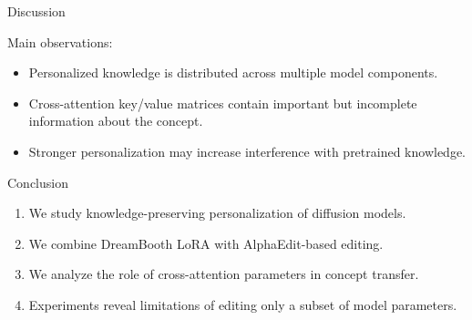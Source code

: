 \documentclass[aspectratio=169]{beamer}
\begin{document}


\begin{frame}{Discussion}


Main observations:


\begin{itemize}

\item Personalized knowledge is distributed across multiple model components.

\item Cross-attention key/value matrices contain important but incomplete
information about the concept.

\item Stronger personalization may increase interference with pretrained
knowledge.

\end{itemize}


\end{frame}




\begin{frame}{Conclusion}


\begin{enumerate}[1)]

\item We study knowledge-preserving personalization of diffusion models.

\item We combine DreamBooth LoRA with AlphaEdit-based editing.

\item We analyze the role of cross-attention parameters in concept transfer.

\item Experiments reveal limitations of editing only a subset of model
parameters.

\end{enumerate}


\end{frame}
\end{document}
